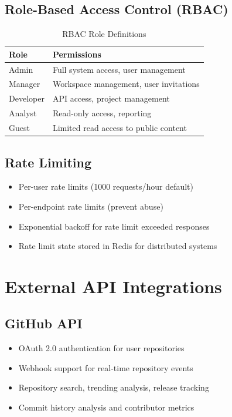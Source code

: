 \documentclass[12pt,a4paper]{report}
\begin{document}
\subsection{Role-Based Access Control (RBAC)}

\begin{table}[H]
\centering
\small
\begin{tabular}{|l|l|}
\hline
\textbf{Role} & \textbf{Permissions} \\
\hline
Admin & Full system access, user management \\
Manager & Workspace management, user invitations \\
Developer & API access, project management \\
Analyst & Read-only access, reporting \\
Guest & Limited read access to public content \\
\hline
\end{tabular}
\caption{RBAC Role Definitions}
\end{table}

\subsection{Rate Limiting}

\begin{itemize}[label=\textbullet]
    \item Per-user rate limits (1000 requests/hour default)
    \item Per-endpoint rate limits (prevent abuse)
    \item Exponential backoff for rate limit exceeded responses
    \item Rate limit state stored in Redis for distributed systems
\end{itemize}

\section{External API Integrations}

\subsection{GitHub API}

\begin{itemize}[label=\textbullet]
    \item OAuth 2.0 authentication for user repositories
    \item Webhook support for real-time repository events
    \item Repository search, trending analysis, release tracking
    \item Commit history analysis and contributor metrics
\end{itemize}
\end{document}
